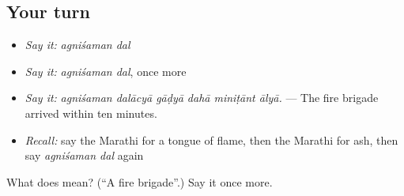 \subsection*{Your turn}
\begin{itemize}
\raggedright
  \item \emph{Say it:} \emph{agniśaman dal}
  \item \emph{Say it:} \emph{agniśaman dal}, once more
  \item \emph{Say it:} \emph{agniśaman dalācyā gāḍyā dahā miniṭānt ālyā.} — The fire brigade arrived within ten minutes.
  \item \emph{Recall:} say the Marathi for a tongue of flame, then the Marathi for ash, then say \emph{agniśaman dal} again
\end{itemize}

\begin{tcolorbox}[breakable,colback=teal!4,colframe=teal!35!black,title={Before you move on}]
What does   mean? (\textquotedblleft{}A fire brigade\textquotedblright{}.) Say it once more.
\end{tcolorbox}
